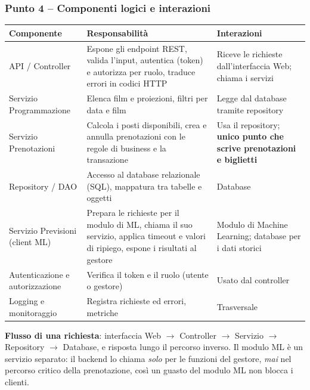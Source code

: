 \subsubsection*{Punto 4 -- Componenti logici e interazioni}
\begin{center}
\small
\begin{tabularx}{\textwidth}{@{}>{\raggedright\arraybackslash}p{3.4cm}XX@{}}
\toprule
\textbf{Componente} & \textbf{Responsabilità} & \textbf{Interazioni} \\
\midrule
API / Controller & Espone gli endpoint REST, valida l'input, autentica (token) e autorizza per ruolo, traduce errori in codici HTTP & Riceve le richieste dall'interfaccia Web; chiama i servizi \\
Servizio Programmazione & Elenca film e proiezioni, filtri per data e film & Legge dal database tramite repository \\
Servizio Prenotazioni & Calcola i posti disponibili, crea e annulla prenotazioni con le regole di business e la transazione & Usa il repository; \textbf{unico punto che scrive prenotazioni e biglietti} \\
Repository / DAO & Accesso al database relazionale (SQL), mappatura tra tabelle e oggetti & Database \\
Servizio Previsioni (client ML) & Prepara le richieste per il modulo di ML, chiama il suo servizio, applica timeout e valori di ripiego, espone i risultati al gestore & Modulo di Machine Learning; database per i dati storici \\
Autenticazione e autorizzazione & Verifica il token e il ruolo (utente o gestore) & Usato dal controller \\
Logging e monitoraggio & Registra richieste ed errori, metriche & Trasversale \\
\bottomrule
\end{tabularx}
\end{center}

\textbf{Flusso di una richiesta}: interfaccia Web $\to$ Controller $\to$ Servizio $\to$ Repository $\to$ Database, e risposta lungo il percorso inverso. Il modulo ML è un servizio separato: il backend lo chiama \emph{solo} per le funzioni del gestore, \emph{mai} nel percorso critico della prenotazione, così un guasto del modulo ML non blocca i clienti.

